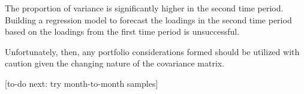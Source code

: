 \documentclass[12pt,twoside]{article}
\begin{document}
The proportion of variance is significantly higher in the second time period. Building a regression model to forecast the loadings in the second time period based on the loadings from the first time period is unsuccessful.

Unfortunately, then, any portfolio considerations formed should be utilized with caution given the changing nature of the covariance matrix.

[to-do next: try month-to-month samples]
\end{document}
